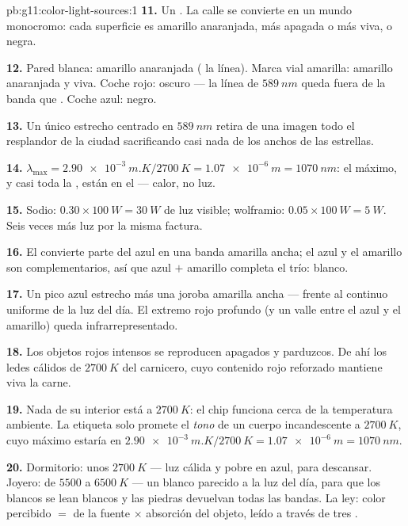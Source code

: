 \begin{solution}{pb:g11:color-light-sources:1}
\textbf{11.} Un . La calle se convierte en
un mundo monocromo: cada superficie es amarillo anaranjada, más apagada
o más viva, o negra.

\textbf{12.} Pared blanca: amarillo anaranjada ( la línea). Marca
vial amarilla: amarillo anaranjada y viva. Coche rojo: oscuro --- la
línea de $\qty{589}{nm}$ queda fuera de la banda que . Coche
azul: negro.

\textbf{13.} Un único  estrecho centrado en $\qty{589}{nm}$ retira
de una imagen todo el resplandor de la ciudad sacrificando casi nada de
los  anchos de las estrellas.

\textbf{14.} $\lambda_{\max} = \qty{2.90e-3}{m.K}/\qty{2700}{K} =
\qty{1.07e-6}{m} = \qty{1070}{nm}$: el máximo, y casi toda la ,
están en el  --- calor, no luz.

\textbf{15.} Sodio: $0.30 \times \qty{100}{W} = \qty{30}{W}$ de luz
visible; wolframio: $0.05 \times \qty{100}{W} = \qty{5}{W}$. Seis veces
más luz por la misma factura.

\textbf{16.} El  convierte parte del azul en una banda amarilla
ancha; el azul y el amarillo son complementarios, así que azul $+$
amarillo completa el trío: blanco.

\textbf{17.} Un pico azul estrecho más una joroba amarilla ancha ---
frente al continuo uniforme de la luz del día. El extremo rojo profundo
(y un valle entre el azul y el amarillo) queda infrarrepresentado.

\textbf{18.} Los objetos rojos intensos se reproducen apagados y
parduzcos. De ahí los ledes cálidos de $\qty{2700}{K}$ del carnicero,
cuyo contenido rojo reforzado mantiene viva la carne.

\textbf{19.} Nada de su interior está a $\qty{2700}{K}$: el chip
funciona cerca de la temperatura ambiente. La etiqueta solo promete el
\emph{tono} de un cuerpo incandescente a $\qty{2700}{K}$, cuyo máximo
estaría en
$\qty{2.90e-3}{m.K}/\qty{2700}{K} = \qty{1.07e-6}{m} = \qty{1070}{nm}$.

\textbf{20.} Dormitorio: unos $\qty{2700}{K}$ --- luz cálida y pobre en
azul, para descansar. Joyero: de $5500$ a $\qty{6500}{K}$ --- un blanco
parecido a la luz del día, para que los blancos se lean blancos y las
piedras devuelvan todas las bandas. La ley: color percibido $=$ 
de la fuente $\times$ absorción del objeto, leído a través de tres
.
\end{solution}
